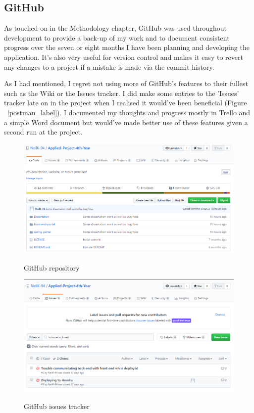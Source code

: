 \subsection{GitHub}
As touched on in the Methodology chapter, GitHub was used throughout development to provide a back-up of my work and to document consistent progress over the seven or eight months I have been planning and developing the application. It's also very useful for version control and makes it easy to revert any changes to a project if a mistake is made via the commit history.

As I had mentioned, I regret not using more of GitHub's features to their fullest such as the Wiki or the Issues tracker. I did make some entries to the 'Issues' tracker late on in the project when I realised it would've been beneficial (Figure ~\ref{postman_label}). I documented my thoughts and progress mostly in Trello and a simple Word document but would've made better use of these features given a second run at the project.

\begin{figure}[ht]
    \centering
    \begin{minipage}{0.5\textwidth}
        \centering
        \includegraphics[scale=0.25]{Images/github1.png} 
        \label{git1_label}
        \caption{GitHub repository}
    \end{minipage}\hfill
    \begin{minipage}{0.5\textwidth}
        \centering
        \includegraphics[scale=0.25]{Images/github2.png}
        \label{git2_label}
        \caption{GitHub issues tracker}
    \end{minipage}
\end{figure}

